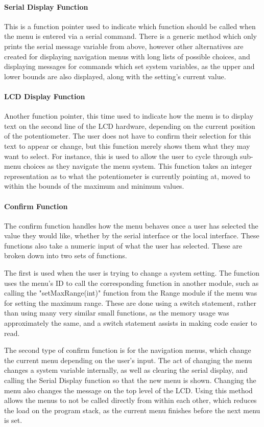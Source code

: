 \documentclass[]{report}
\begin{document}
\paragraph{Serial Display Function}
This is a function pointer used to indicate which function should be called when the menu is entered via a serial command. There is a generic method which only prints the serial message variable from above, however other alternatives are created for displaying navigation menus with long lists of possible choices, and displaying messages for commands which set system variables, as the upper and lower bounds are also displayed, along with the setting's current value.

\paragraph{LCD Display Function}
Another function pointer, this time used to indicate how the menu is to display text on the second line of the LCD hardware, depending on the current position of the potentiometer. The user does not have to confirm their selection for this text to appear or change, but this function merely shows them what they may want to select. For instance, this is used to allow the user to cycle through sub-menu choices as they navigate the menu system. This function takes an integer representation as to what the potentiometer is currently pointing at, moved to within the bounds of the maximum and minimum values.

\paragraph{Confirm Function}
The confirm function handles how the menu behaves once a user has selected the value they would like, whether by the serial interface or the local interface. These functions also take a numeric input of what the user has selected. These are broken down into two sets of functions.

The first is used when the user is trying to change a system setting. The function uses the menu's ID to call the corresponding function in another module, such as calling the "setMaxRange(int)" function from the Range module if the menu was for setting the maximum range. These are done using a switch statement, rather than using many very similar small functions, as the memory usage was approximately the same, and a switch statement assists in making code easier to read.

The second type of confirm function is for the navigation menus, which change the current menu depending on the user's input. The act of changing the menu changes a system variable internally, as well as clearing the serial display, and calling the Serial Display function so that the new menu is shown. Changing the menu also changes the message on the top level of the LCD. Using this method allows the menus to not be called directly from within each other, which reduces the load on the program stack, as the current menu finishes before the next menu is set.
\end{document}
